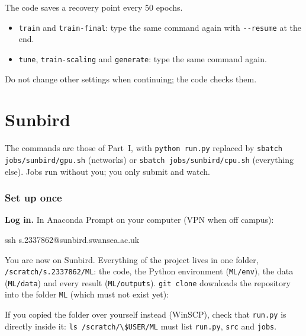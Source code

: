 \documentclass[11pt,a4paper]{article}
\newcommand{\code}[1]{\lstinline{#1}}
\begin{document}
The code saves a recovery point every 50 epochs.
\begin{itemize}
  \item \code{train} and \code{train-final}: type the same command again with \code{--resume}
        at the end.
  \item \code{tune}, \code{train-scaling} and \code{generate}: type the same command again.
\end{itemize}
Do not change other settings when continuing; the code checks them.

\part{Sunbird}

The commands are those of Part~I, with \code{python run.py} replaced by
\code{sbatch jobs/sunbird/gpu.sh} (networks) or \code{sbatch jobs/sunbird/cpu.sh}
(everything else). Jobs run without you; you only submit and watch.

\section{Set up once}

\textbf{Log in.} In Anaconda Prompt on your computer (VPN when off campus):

\begin{cmd}
ssh s.2337862@sunbird.swansea.ac.uk
\end{cmd}

You are now on Sunbird. Everything of the project lives in one folder,
\code{/scratch/s.2337862/ML}: the code, the Python environment (\code{ML/env}), the data
(\code{ML/data}) and every result (\code{ML/outputs}). \code{git clone} downloads the
repository into the folder \code{ML} (which must not exist yet):


If you copied the folder over yourself instead (WinSCP), check that \code{run.py} is directly inside it:
\code{ls /scratch/\$USER/ML} must list \code{run.py}, \code{src} and \code{jobs}.
\end{document}
